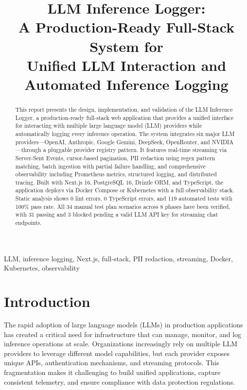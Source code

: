 \documentclass[conference]{IEEEtran}
\begin{document}
\title{LLM Inference Logger:\\A Production-Ready Full-Stack System for\\Unified LLM Interaction and Automated Inference Logging}

\author{
}

\maketitle

\begin{abstract}
This report presents the design, implementation, and validation of the LLM Inference Logger, a production-ready full-stack web application that provides a unified interface for interacting with multiple large language model (LLM) providers while automatically logging every inference operation. The system integrates six major LLM providers---OpenAI, Anthropic, Google Gemini, DeepSeek, OpenRouter, and NVIDIA---through a pluggable provider registry pattern. It features real-time streaming via Server-Sent Events, cursor-based pagination, PII redaction using regex pattern matching, batch ingestion with partial failure handling, and comprehensive observability including Prometheus metrics, structured logging, and distributed tracing. Built with Next.js 16, PostgreSQL 16, Drizzle ORM, and TypeScript, the application deploys via Docker Compose or Kubernetes with a full observability stack. Static analysis shows 0 lint errors, 0 TypeScript errors, and 119 automated tests with 100\% pass rate. All 34 manual test plan scenarios across 8 phases have been verified, with 31 passing and 3 blocked pending a valid LLM API key for streaming chat endpoints.
\end{abstract}

\begin{IEEEkeywords}
LLM, inference logging, Next.js, full-stack, PII redaction, streaming, Docker, Kubernetes, observability
\end{IEEEkeywords}

\section{Introduction}

The rapid adoption of large language models (LLMs) in production applications has created a critical need for infrastructure that can manage, monitor, and log inference operations at scale. Organizations increasingly rely on multiple LLM providers to leverage different model capabilities, but each provider exposes unique APIs, authentication mechanisms, and streaming protocols. This fragmentation makes it challenging to build unified applications, capture consistent telemetry, and ensure compliance with data protection regulations.
\end{document}

